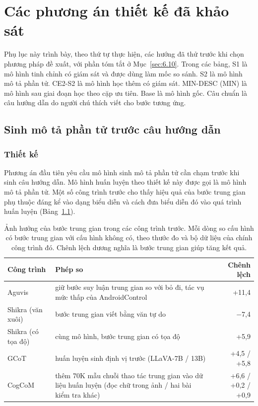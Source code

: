 \chapter{Các phương án thiết kế đã khảo sát}
\label{app:A}

Phụ lục này trình bày, theo thứ tự thực hiện, các hướng đã thử trước khi chọn phương pháp đề xuất, với phần tóm tắt ở Mục~\ref{sec:6.10}. Trong các bảng, S1 là mô hình tinh chỉnh có giám sát và được dùng làm mốc so sánh. S2 là mô hình mô tả phần tử. CE2-S2 là mô hình học thêm có giám sát. MIN-DESC (MIN) là mô hình sau giai đoạn học theo cặp ưu tiên. Base là mô hình gốc. Câu chuẩn là câu hướng dẫn do người chú thích viết cho bước tương ứng.

\section{Sinh mô tả phần tử trước câu hướng dẫn}\label{sec:A.1}

\subsection{Thiết kế}\label{sec:A.1.1}

Phương án đầu tiên yêu cầu mô hình sinh mô tả phần tử cần chạm trước khi sinh câu hướng dẫn. Mô hình huấn luyện theo thiết kế này được gọi là mô hình mô tả phần tử. Một số công trình trước cho thấy hiệu quả của bước trung gian phụ thuộc đáng kể vào dạng biểu diễn và cách đưa biểu diễn đó vào quá trình huấn luyện (Bảng~\ref{tab:A.intermediate_prior}).

\begin{table}[htbp]
\centering\small
\caption[Ảnh hưởng của bước trung gian trong các công trình trước.]{Ảnh hưởng của bước trung gian trong các công trình trước. Mỗi dòng so cấu hình có bước trung gian với cấu hình không có, theo thước đo và bộ dữ liệu của chính công trình đó. Chênh lệch dương nghĩa là bước trung gian giúp tăng kết quả.}\label{tab:A.intermediate_prior}
\setlength{\tabcolsep}{4pt}
\begin{tabularx}{\textwidth}{@{}>{\raggedright\arraybackslash\hsize=0.57\hsize}X>{\raggedright\arraybackslash\hsize=1.43\hsize}Xr@{}}
\toprule
\textbf{Công trình} & \textbf{Phép so} & \textbf{Chênh lệch} \\
\midrule
Aguvis~\cite{aguvis} & giữ bước suy luận trung gian so với bỏ đi, tác vụ mức thấp của AndroidControl & +11,4 \\
Shikra (văn xuôi)~\cite{shikra} & bước trung gian viết bằng văn tự do & $-$7,4 \\
Shikra (có tọa độ)~\cite{shikra} & cùng mô hình, bước trung gian có tọa độ & +5,9 \\
GCoT~\cite{gcot} & huấn luyện sinh định vị trước (LLaVA-7B / 13B) & +4,5 / +5,8 \\
CogCoM~\cite{cogcom} & thêm 70K mẫu chuỗi thao tác trung gian vào dữ liệu huấn luyện (đọc chữ trong ảnh / hai bài kiểm tra khác) & +6,6 / +0,2 / +0,9 \\
\bottomrule
\end{tabularx}
\end{table}

